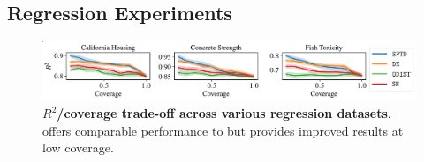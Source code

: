 

\subsection{Regression Experiments}
\label{sec:regr_exp}

\begin{figure}[t]
    \centering
    \includegraphics[width=0.97\linewidth]{figs/sptd/regr_sn.pdf}
    \caption[$R^2$/coverage trade-off across various regression datasets.]{\textbf{$R^2$/coverage trade-off across various regression datasets}. \sptd offers comparable performance to \de but provides improved results at low coverage.}
    \label{fig:regr}
\end{figure}

